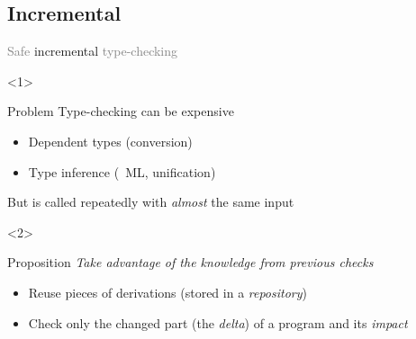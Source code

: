 \documentclass{beamer}
\begin{document}
\subsection{Incremental}

\begin{frame}{\textcolor{gray}{Safe} incremental
    \textcolor{gray}{type-checking}}


  \begin{onlyenv}<1>
    \begin{block}{Problem}
      Type-checking can be expensive
      \begin{example}
        \begin{itemize}
        \item Dependent types (conversion)
        \item Type inference (\eg\ ML, unification)
        \end{itemize}
      \end{example}
      But is called repeatedly with \emph{almost} the same input
    \end{block}
  \end{onlyenv}

  \begin{onlyenv}<2>
    \begin{block}{Proposition}
      \emph{Take advantage of the knowledge from previous checks}
      \begin{itemize}
      \item Reuse pieces of derivations (stored in a \emph{repository})
      \item Check only the changed part (the \emph{delta}) of a
        program and its \emph{impact}
      \end{itemize}

      \begin{figure}
        \centering
      \end{figure}
    \end{block}
  \end{onlyenv}


\end{frame}
\end{document}
